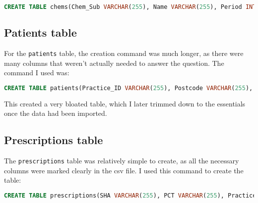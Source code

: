 \documentclass{report}
\begin{document}
\begin{lstlisting}[language=SQL, caption=Creating the chems table]
CREATE TABLE chems(Chem_Sub VARCHAR(255), Name VARCHAR(255), Period INT);
\end{lstlisting}

\subsection{Patients table}
For the \texttt{patients} table, the creation command was much longer, as there were many columns that weren't actually needed to answer the question. The command I used was:
\newpage
\begin{lstlisting}[language=SQL, caption=Creating the patients table]
CREATE TABLE patients(Practice_ID VARCHAR(255), Postcode VARCHAR(255), ONS_CCG_Code VARCHAR(255), CCG_Code VARCHAR(255), ONS_Region_Code VARCHAR(255), NHSE_Region_Code VARCHAR(255), ONS_Comm_Rgn_Code VARCHAR(255), NHSE_Comm_Rgn_Code VARCHAR(255), Total_All INT, Total_Male INT, Total_Female INT, Male_0_4 INT, Male_5_9 INT, Male_10_14 INT, Male_15_19 INT, Male_20_24 INT, Male_25_29 INT, Male_30_34 INT, Male_35_39 INT, Male_40_44 INT, Male_45_49 INT, Male_50_54 INT, Male_55_59 INT, Male_60_64 INT, Male_65_69 INT, Male_70_74 INT, Male_75_79 INT, Male_80_84 INT, Male_85_89 INT, Male_90_94 INT, Male_95_Up INT, Female_0_4 INT, Female_5_9 INT, Female_10_14 INT, Female_15_19 INT, Female_20_24 INT, Female_25_29 INT, Female_30_34 INT, Female_35_39 INT, Female_40_44 INT, Female_45_49 INT, Female_50_54 INT, Female_55_59 INT, Female_60_64 INT, Female_65_69 INT, Female_70_74 INT, Female_75_79 INT, Female_80_84 INT, Female_85_89 INT, Female_90_94 INT, Female_95_Up INT);
\end{lstlisting}
This created a very bloated table, which I later trimmed down to the essentials once the data had been imported.

\subsection{Prescriptions table}
The \texttt{prescriptions} table was relatively simple to create, as all the necessary columns were marked clearly in the csv file. I used this command to create the table:

\begin{lstlisting}[language=SQL, caption=Creating the prescriptions table]
CREATE TABLE prescriptions(SHA VARCHAR(255), PCT VARCHAR(255), Practice_ID VARCHAR(255), BNF_Code VARCHAR(255), BNF_Name VARCHAR(255), Items INT, NIC DOUBLE, ACT_Cost DOUBLE, Quantity INT, Period INT);
\end{lstlisting}
\end{document}

